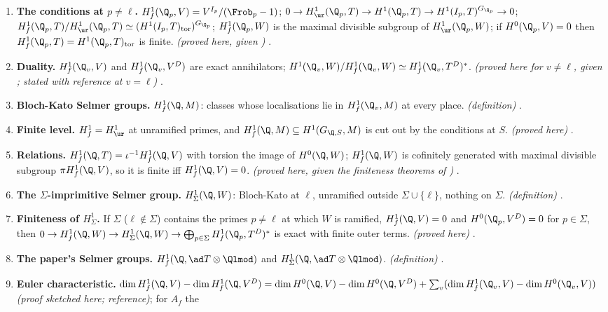 \begin{enumerate}[label=\textbf{\thechapter.\arabic*}]
.
\item \textbf{The conditions at $p\ne\ell$.} $H^1_f(\Q_p,V)=V^{I_p}/(\Frob_p-1)$; $0\to H^1_{\ur}(\Q_p,T)\to H^1(\Q_p,T)\to H^1(I_p,T)^{G_{\Q_p}}\to0$; $H^1_f(\Q_p,T)/H^1_{\ur}(\Q_p,T)\simeq(H^1(I_p,T)_{\mathrm{tor}})^{G_{\Q_p}}$;
$H^1_f(\Q_p,W)$ is the maximal divisible subgroup of $H^1_{\ur}(\Q_p,W)$; if $H^0(\Q_p,V)=0$ then $H^1_f(\Q_p,T)=H^1(\Q_p,T)_{\mathrm{tor}}$ is finite. \emph{(proved here, given
)} .
\item \textbf{Duality.} $H^1_f(\Q_v,V)$ and $H^1_f(\Q_v,V^D)$ are exact annihilators; $H^1(\Q_v,W)/H^1_f(\Q_v,W)\simeq H^1_f(\Q_v,T^D)^*$. \emph{(proved here for $v\ne\ell$, given ;
stated with reference at $v=\ell$)} .
\item \textbf{Bloch-Kato Selmer groups.} $H^1_f(\Q,M)$: classes whose localisations lie in $H^1_f(\Q_v,M)$ at every place. \emph{(definition)} .
\item \textbf{Finite level.} $H^1_f=H^1_{\ur}$ at unramified primes, and $H^1_f(\Q,M)\subseteq H^1(G_{\Q,S},M)$ is cut out by the conditions at $S$. \emph{(proved here)} .
\item \textbf{Relations.} $H^1_f(\Q,T)=\iota^{-1}H^1_f(\Q,V)$ with torsion the image of $H^0(\Q,W)$; $H^1_f(\Q,W)$ is cofinitely generated with maximal divisible subgroup $\pi H^1_f(\Q,V)$, so it is finite
iff $H^1_f(\Q,V)=0$. \emph{(proved here, given the finiteness theorems of )} .
\item \textbf{The $\Sigma$-imprimitive Selmer group.} $H^1_\Sigma(\Q,W)$: Bloch-Kato at $\ell$, unramified outside $\Sigma\cup\{\ell\}$, nothing on $\Sigma$. \emph{(definition)}
.
\item \textbf{Finiteness of $H^1_\Sigma$.} If $\Sigma$ ($\ell\notin\Sigma$) contains the primes $p\ne\ell$ at which $W$ is ramified, $H^1_f(\Q,V)=0$ and $H^0(\Q_p,V^D)=0$ for $p\in\Sigma$, then $0\to H^1_f(\Q,W)\to H^1_\Sigma(\Q,W)\to\bigoplus_{p\in\Sigma}H^1_f(\Q_p,T^D)^*$ is exact with finite outer
terms. \emph{(proved here)} .
\item \textbf{The paper's Selmer groups.} $H^1_f(\Q,\ad T\otimes\Qlmod)$ and $H^1_\Sigma(\Q,\ad T\otimes\Qlmod)$. \emph{(definition)} .
\item \textbf{Euler characteristic.} $\dim H^1_f(\Q,V)-\dim H^1_f(\Q,V^D)=\dim H^0(\Q,V)-\dim H^0(\Q,V^D)+\sum_v(\dim H^1_f(\Q_v,V)-\dim H^0(\Q_v,V))$ \emph{(proof sketched here; reference)}; for $A_f$ the

\end{enumerate}
